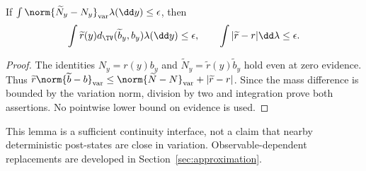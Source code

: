 \begin{lemma}\label{lem:instrument-stability}
If $\int\norm{\widetilde N_y-N_y}_{\rm var}\lambda(\dd y)\le\epsilon$, then
\[
 \int\widetilde r(y)d_{\TV}(\widetilde b_y,b_y)\lambda(\dd y)\le\epsilon,
 \qquad \int|\widetilde r-r|\dd\lambda\le\epsilon.
\]
\end{lemma}
\begin{proof}
The identities $N_y=r(y)b_y$ and $\widetilde N_y=\widetilde r(y)\widetilde b_y$ hold even at zero evidence. Thus
$\widetilde r\norm{\widetilde b-b}_{\rm var}
\le\norm{\widetilde N-N}_{\rm var}+|\widetilde r-r|$.
Since the mass difference is bounded by the variation norm, division by two and integration prove both assertions. No pointwise lower bound on evidence is used.
\end{proof}

This lemma is a sufficient continuity interface, not a claim that nearby deterministic post-states are close in variation. Observable-dependent replacements are developed in Section~\ref{sec:approximation}.
\par
